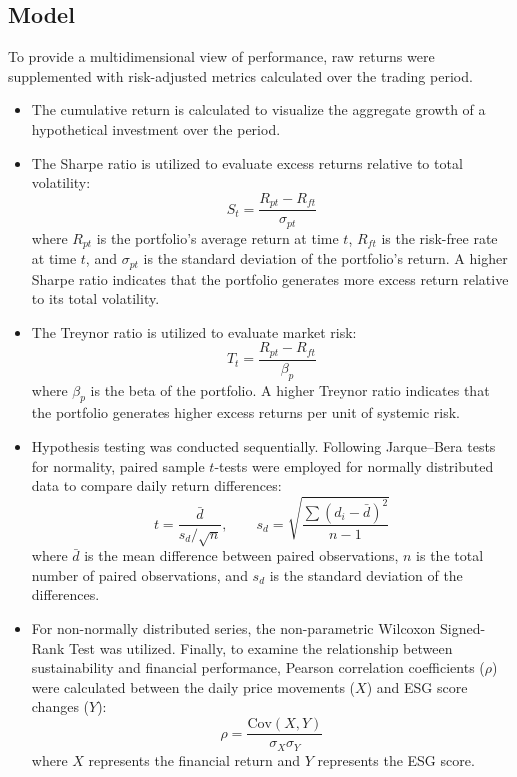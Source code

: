 \documentclass[12pt]{article}
\begin{document}
\subsection{Model}
To provide a multidimensional view of performance, raw returns were supplemented with risk-adjusted metrics calculated over the trading period.
\begin{itemize}
    \item The cumulative return is calculated to visualize the aggregate growth of a hypothetical investment over the period.
    \item The Sharpe ratio is utilized to evaluate excess returns relative to total volatility:
    \begin{equation}
    S_t = \frac{R_{pt} - R_{ft}}{\sigma_{pt}}
    \end{equation}
    where $R_{pt}$ is the portfolio's average return at time $t$, $R_{ft}$ is the risk-free rate at time $t$, and $\sigma_{pt}$ is the standard deviation of the portfolio's return. A higher Sharpe ratio indicates that the portfolio generates more excess return relative to its total volatility.
    \item The Treynor ratio is utilized to evaluate market risk:
    \begin{equation}
    T_t = \frac{R_{pt} - R_{ft}}{\beta_p}
    \end{equation}
    where $\beta_p$ is the beta of the portfolio. A higher Treynor ratio indicates that the portfolio generates higher excess returns per unit of systemic risk.
    \item Hypothesis testing was conducted sequentially. Following Jarque--Bera tests for normality, paired sample $t$-tests were employed for normally distributed data to compare daily return differences:
    \begin{equation}
    t = \frac{\bar{d}}{s_d / \sqrt{n}},\qquad
    s_d = \sqrt{\frac{\sum (d_i - \bar{d})^2}{n-1}}
    \end{equation}
    where $\bar{d}$ is the mean difference between paired observations, $n$ is the total number of paired observations, and $s_d$ is the standard deviation of the differences.
    \item For non-normally distributed series, the non-parametric Wilcoxon Signed-Rank Test was utilized. Finally, to examine the relationship between sustainability and financial performance, Pearson correlation coefficients ($\rho$) were calculated between the daily price movements ($X$) and ESG score changes ($Y$):
    \begin{equation}
    \rho = \frac{\mathrm{Cov}(X,Y)}{\sigma_X \sigma_Y}
    \end{equation}
    where $X$ represents the financial return and $Y$ represents the ESG score.
\end{itemize}
\end{document}
